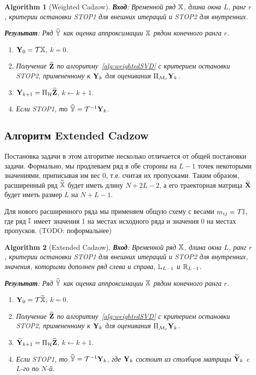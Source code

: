 \documentclass[12pt,a4paper,fleqn,leqno]{article}
\newtheorem{algorithm}{Algorithm}%
\begin{document}
\begin{algorithm}[Weighted Cadzow]
\textbf{Вход}: Временной ряд $\mathbb{X}$, длина окна $L$, ранг $r$,
критерии остановки STOP1 для внешних итераций и STOP2 для внутренних.

\textbf{Результат}:
Ряд $\widehat{\mathbb{Y}}$ как оценка аппроксимации $\mathbb{X}$ рядом конечного ранга $r$.

\begin{enumerate}
\item
$\mathbf{Y}_0 = \mathcal{T} \mathbb{X}$, $k=0$.
\item
Получение $\widehat{\mathbf{Z}}$ по алгоритму~\ref{alg:weightedSVD} с критерием остановки STOP2, примененному к $\mathbf{Y}_k$ для оценивания $\Pi_{\mathcal{M}_r} \mathbf{Y}_{k}$.
\item
$\mathbf{Y}_{k+1} = \Pi_{\mathcal{H}}  \widehat{\mathbf{Z}}$, $k\leftarrow k+1$.
\item
Если STOP1, то $\widehat{\mathbb{Y}} = \mathcal{T}^{-1} \mathbf{Y}_k$.
\end{enumerate}
\end{algorithm}

\subsection{Алгоритм Extended Cadzow}

Постановка задачи в этом алгоритме несколько отличается от общей постановки задачи.
Формально, мы продлеваем ряд в обе стороны на $L-1$ точек некоторыми значениями, приписывая им вес 0, т.е.
считая их пропусками. Таким образом, расширенный ряд $\widetilde{\mathbb{X}}$ будет иметь длину $N+2L-2$, а его траекторная матрица
$\widetilde{\mathbf{X}}$ будет иметь размер $L$ на $N+L-1$.

Для нового расширенного ряда мы применяем общую схему с весами $m_{ij}=\mathcal{T} \mathbb{I}$, где ряд $\mathbb{I}$ имеет 
значения 1 на местах исходного ряда и значения 0 на местах пропусков.
(TODO: поформальнее)

\begin{algorithm}[Extended Cadzow]
\textbf{Вход}: Временной ряд $\mathbb{X}$, длина окна $L$, ранг $r$,
критерии остановки STOP1 для внешних итераций и STOP2 для внутренних,
значения, которыми дополнен ряд слева и справа, $\mathbb{L}_{L-1}$ и $\mathbb{R}_{L-1}$.

\textbf{Результат}:
Ряд $\widehat{\mathbb{Y}}$ как оценка аппроксимации $\mathbb{X}$ рядом конечного ранга $r$.

\begin{enumerate}
\item
$\mathbf{Y}_0 = \mathcal{T} \widetilde{\mathbb{X}}$, $k=0$.
\item
Получение $\widehat{\mathbf{Z}}$ по алгоритму~\ref{alg:weightedSVD} с критерием остановки STOP2, примененному к $\mathbf{Y}_k$ для оценивания $\Pi_{\mathcal{M}_r} \mathbf{Y}_{k}$.
\item
$\widetilde{\mathbf{Y}}_{k+1} = \Pi_{\mathcal{H}}  \widehat{\mathbf{Z}}$, $k\leftarrow k+1$.
\item
Если STOP1, то $\widehat{\mathbb{Y}} = \mathcal{T}^{-1} \mathbf{Y}_k$, где $\mathbf{Y}_k$ состоит из столбцов матрицы $\widetilde{\mathbf{Y}}_{k}$
c $L$-го по $N$-й.
\end{enumerate}
\end{algorithm}
\end{document}
